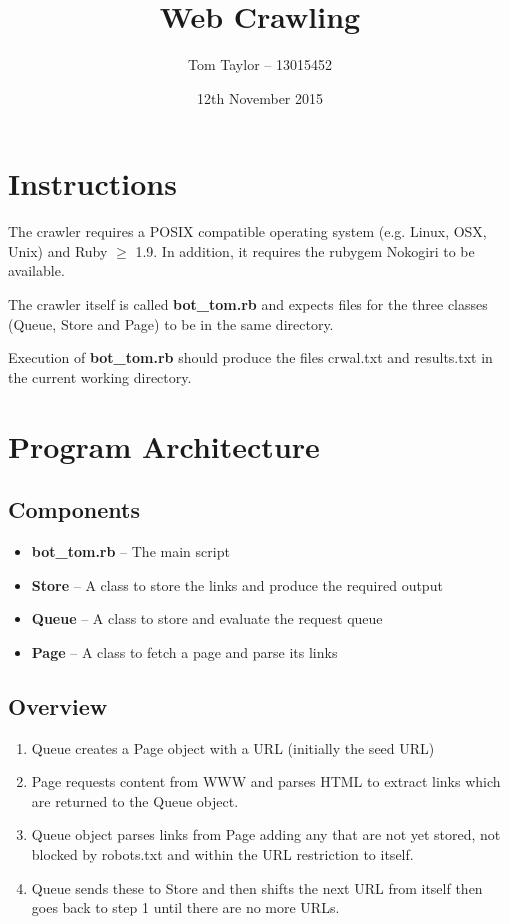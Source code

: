 \documentclass[a4paper,11pt]{article}
\title{Web Crawling}
\author{Tom Taylor -- 13015452}
\date{12th November 2015}
\begin{document}
\maketitle
\section{Instructions}
The crawler requires a POSIX compatible operating system (e.g. Linux, OSX, Unix) and Ruby $\geq$ 1.9.  In addition, it requires the rubygem Nokogiri to be available.

The crawler itself is called \textbf{bot\_tom.rb} and expects files for the three classes (Queue, Store and Page) to be in the same directory.

Execution of \textbf{bot\_tom.rb} should produce the files crwal.txt and results.txt in the current working directory.

\section{Program Architecture}
\subsection{Components}
\begin{itemize}
  \item \textbf{bot\_tom.rb} -- The main script
  \item \textbf{Store} -- A class to store the links and produce the required output
  \item \textbf{Queue} -- A class to store and evaluate the request queue
  \item \textbf{Page} -- A class to fetch a page and parse its links
\end{itemize}

\subsection{Overview}

\begin{enumerate}
  \item Queue creates a Page object with a URL (initially the seed URL)
  \item Page requests content from WWW and parses HTML to extract links which are returned to the Queue object.
  \item Queue object parses links from Page adding any that are not yet stored, not blocked by robots.txt and within the URL restriction to itself.
  \item Queue sends these to Store and then shifts the next URL from itself then goes back to step 1 until there are no more URLs.
\end{enumerate}
\end{document}
